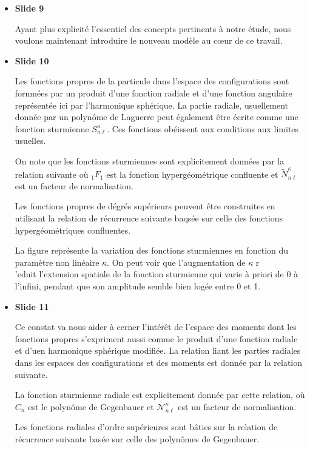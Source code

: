 \documentclass[10pt,a4paper]{article}
\begin{document}
\begin{itemize}
\item \textbf{Slide 9}\par
Ayant plus explicit\'e l'essentiel des concepts pertinents 
\`a notre \'etude, nous voulons maintenant 
introduire le nouveau mod\`ele au c\oe ur de ce travail.

\item \textbf{Slide 10}\par
Les fonctions propres de la particule dans l'espace des configurations
sont fornm\'ees par un produit d'une fonction radiale 
et d'une fonction angulaire repr\'esent\'ee ici par l'harmonique sph\'erique.
La partie radiale, usuellement donn\'ee par un polyn\^ome de 
Laguerre peut \'egalement \^etre \'ecrite comme une fonction 
sturmienne $S_{n\ell}^\kappa$.
Ces fonctions ob\'eissent aux conditions aux limites usuelles.

On note que les fonctions sturmiennes sont explicitement donn\'ees 
par la relation suivante o\`u ${}_1F_1$ est la fonction hyperg\'eom\'etrique 
confluente et $\widetilde{N}_{n\ell}^\kappa$ est un facteur de 
normalisation.

Les fonctions propres de d\'egr\'es sup\'erieurs  
peuvent \^etre construites en utilisant la relation de r\'ecurrence suivante
baqs\'ee sur celle des fonctions hyperg\'eom\'etriques confluentes.

La figure repr\'esente la variation des fonctions sturmiennes 
en fonction du param\`etre non lin\'eaire $\kappa$.
On peut voir que l'augmentation de $\kappa$ r\\'eduit l'extension 
spatiale de la fonction sturmienne qui varie \`a priori de 0 \`a l'infini, 
pendant que son amplitude semble bien log\'ee entre 0 et 1.

\item \textbf{Slide 11}\par
Ce constat va nous aider \`a cerner l'int\'er\^et de l'espace des moments 
dont les fonctions propres s'expriment aussi comme 
le produit d'une fonction radiale et d'uen harmonique sph\'erique modifi\'ee.
La relation liant les parties radiales dans les espaces des configurations 
et des moments est donn\'ee par la relation suivante.  

La fonction sturmienne radiale est explicitement donn\'ee par cette 
relation, o\`u $C_{\bar n}$ est le polyn\^ome de Gegenbauer
et $\mathcal{N}_{n\ell}^\kappa$ est un facteur de normalisation.

Les fonctions radiales d'ordre sup\'erieures sont b\^aties sur la relation 
de r\'ecurrence suivante bas\'ee sur celle des polyn\^omes de Gegenbauer.


\end{itemize}
\end{document}
